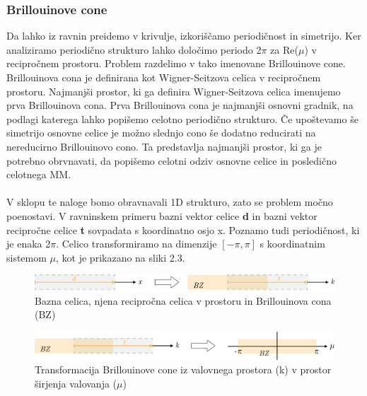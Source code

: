 \documentclass[12pt]{report}
\begin{document}
\subsubsection{Brillouinove cone}
Da lahko iz ravnin preidemo v krivulje, izkoriščamo periodičnost in simetrijo. Ker analiziramo periodično strukturo lahko določimo periodo 2$\pi$ za Re($\mu$) v recipročnem prostoru.
Problem razdelimo v tako imenovane Brillouinove cone. \cite{vanbelle}
\\Brillouinova cona je definirana kot Wigner-Seitzova celica v recipročnem prostoru. Najmanjši prostor, ki ga definira Wigner-Seitzova celica imenujemo prva Brillouinova cona.\cite{abhipod} Prva Brillouinova cona
je najmanjši osnovni gradnik, na podlagi katerega lahko popišemo celotno periodično strukturo. Če upoštevamo še simetrijo osnovne celice je možno slednjo cono še dodatno reducirati na nereducirno Brillouinovo cono. Ta predstavlja najmanjši prostor,
ki ga je potrebno obrvnavati, da popišemo celotni odziv osnovne celice in posledično celotnega \ac{MM}. \cite{kosir}
\\
\\
V sklopu te naloge bomo obravnavali 1D strukturo, zato se problem močno poenostavi. V ravninskem primeru bazni vektor celice \textbf{d} in bazni vektor recipročne celice \textbf{t} sovpadata s koordinatno osjo x. Poznamo tudi periodičnost, ki je enaka 2$\pi$. 
Celico transformiramo na dimenzije $[-\pi, \pi]$ s koordinatnim sistemom $\mu$, kot je prikazano na sliki 2.3.

\begin{figure}[H]
  \centering
  \includegraphics[scale=0.8]{Images/osnovna_celica.png}
  \caption{Bazna celica, njena recipročna celica v prostoru in Brillouinova cona (BZ)}
\end{figure}
\begin{figure}[H]
  \centering
  \includegraphics[scale=0.8]{Images/transformacija.png}
  \caption{Transformacija Brillouinove cone iz valovnega prostora (k) v prostor širjenja valovanja ($\mu$)}
\end{figure}
\end{document}
